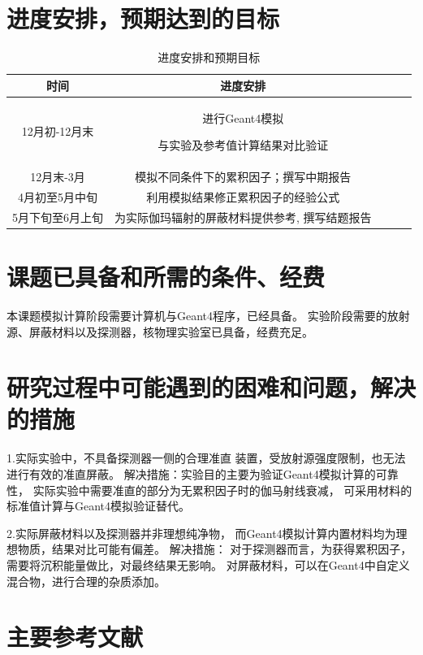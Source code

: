 \section{进度安排，预期达到的目标}
\begin{table}[htbp]
    \caption{进度安排和预期目标}
    \vspace{0.5em}\centering\wuhao
    \begin{tabular}{ccccc}
    \toprule[1pt]
    时间 & 进度安排\\
    \midrule[2pt]
    12月初-12月末 & 进行Geant4模拟

    与实验及参考值计算结果对比验证\\
    12月末-3月 & 模拟不同条件下的累积因子；撰写中期报告\\
    4月初至5月中旬 & 
    利用模拟结果修正累积因子的经验公式\\
    5月下旬至6月上旬 & 为实际伽玛辐射的屏蔽材料提供参考,
    撰写结题报告\\
    \bottomrule[1.5pt]
    \end{tabular}
    \end{table}
\section{课题已具备和所需的条件、经费}
本课题模拟计算阶段需要计算机与Geant4程序，已经具备。
实验阶段需要的放射源、屏蔽材料以及探测器，核物理实验室已具备，经费充足。
\section{研究过程中可能遇到的困难和问题，解决的措施}
1.实际实验中，不具备探测器一侧的合理准直
装置，受放射源强度限制，也无法进行有效的准直屏蔽。
解决措施：实验目的主要为验证Geant4模拟计算的可靠性，
实际实验中需要准直的部分为无累积因子时的伽马射线衰减，
可采用材料的标准值计算与Geant4模拟验证替代。

2.实际屏蔽材料以及探测器并非理想纯净物，
而Geant4模拟计算内置材料均为理想物质，结果对比可能有偏差。
解决措施：
对于探测器而言，为获得累积因子，需要将沉积能量做比，对最终结果无影响。
对屏蔽材料，可以在Geant4中自定义混合物，进行合理的杂质添加。
\section{主要参考文献}


